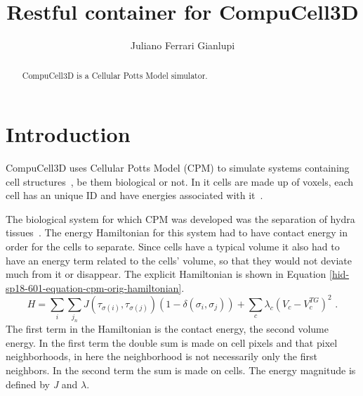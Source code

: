 
\title{Restful container for CompuCell3D}

\author{Juliano Ferrari Gianlupi}


\renewcommand{\shortauthors}{J. F. Gianlupi}


\begin{abstract}

CompuCell3D is a Cellular Potts Model simulator. 

 
\end{abstract}



\maketitle

\section{Introduction}\label{hid-sp18-601-project-section-introduction}

CompuCell3D uses Cellular Potts Model (CPM) to simulate systems containing 
cell 
structures~\cite{hid-sp18-601-paper-swat2012multi}, be them biological or not.
 In it cells are made up of voxels, each cell has an unique ID and have energies
 associated with it~\cite{hid-sp18-601-paper-glazier1993simulation}.

The biological system for which CPM was developed was the separation of hydra 
tissues~\cite{hid-sp18-601-paper-glazier1993simulation}. The energy Hamiltonian 
for this system had to have contact energy in order for the cells to separate. 
Since cells have a typical volume it also had to have an energy term related to 
the cells' volume, so that they would not  deviate much from it or disappear. 
The explicit Hamiltonian is shown in Equation 
\ref{hid-sp18-601-equation-cpm-orig-hamiltonian}.
\begin{equation}\label{hid-sp18-601-equation-cpm-orig-hamiltonian}
H = \sum_i \sum_{j_n} J(\tau_{\sigma(i)},\tau_{\sigma(j)
})(1 - \delta(\sigma_i,\sigma_j)) + \sum_{c}\lambda_{c}\left(V_{c
} - V^{TG}_{c}\right)^2\,\,.
\end{equation}
The first term in the Hamiltonian is the contact energy, the second volume
 energy. In the first 
term the double sum is made on cell pixels and that pixel neighborhoods, in here
the neighborhood is not necessarily only the first neighbors. In 
the second term the sum is made on cells. The energy magnitude is defined
by \textit{J} and $\lambda$.

